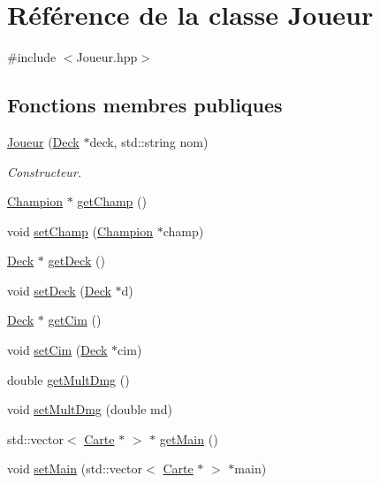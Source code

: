 \hypertarget{class_joueur}{\section{Référence de la classe Joueur}
\label{class_joueur}
}


{\ttfamily \#include $<$Joueur.\-hpp$>$}

\subsection*{Fonctions membres publiques}
\begin{DoxyCompactItemize}
\item 
\hyperlink{class_joueur_a5d2999c278f52be863c3ae8c356dc5dd}{Joueur} (\hyperlink{class_deck}{Deck} $\ast$deck, std\-::string nom)
\begin{DoxyCompactList}\small\item\em Constructeur. \end{DoxyCompactList}\item 
\hyperlink{class_champion}{Champion} $\ast$ \hyperlink{class_joueur_ae4cf4def8bd931f40609d8ee2970e223}{get\-Champ} ()
\item 
void \hyperlink{class_joueur_a4583fb6f3edb2858c06c9b8879e59ffc}{set\-Champ} (\hyperlink{class_champion}{Champion} $\ast$champ)
\item 
\hyperlink{class_deck}{Deck} $\ast$ \hyperlink{class_joueur_a42e4b9f8297af3646805587a9bda7fad}{get\-Deck} ()
\item 
void \hyperlink{class_joueur_a76d1becbccc8e3d7e9767cdd224d1fa6}{set\-Deck} (\hyperlink{class_deck}{Deck} $\ast$d)
\item 
\hyperlink{class_deck}{Deck} $\ast$ \hyperlink{class_joueur_ab87d2c2ad00d77a768b4f71769a46814}{get\-Cim} ()
\item 
void \hyperlink{class_joueur_ae5ad6f405cd958b9568114674d2a0dd5}{set\-Cim} (\hyperlink{class_deck}{Deck} $\ast$cim)
\item 
double \hyperlink{class_joueur_a0841dd21d5fa3b474ae78fb675c648ee}{get\-Mult\-Dmg} ()
\item 
void \hyperlink{class_joueur_aac098c0542b6b90948ef0eba4a8d52f6}{set\-Mult\-Dmg} (double md)
\item 
std\-::vector$<$ \hyperlink{class_carte}{Carte} $\ast$ $>$ $\ast$ \hyperlink{class_joueur_a6c66977dd88ec9b6927ce8035abc2fb7}{get\-Main} ()
\item 
void \hyperlink{class_joueur_a440de4d37f0d29fcaa8bf315fcd2b8be}{set\-Main} (std\-::vector$<$ \hyperlink{class_carte}{Carte} $\ast$ $>$ $\ast$main)

\end{DoxyCompactItemize}
